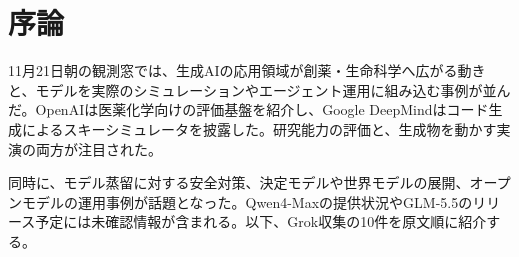 \section{序論}
11月21日朝の観測窓では、生成AIの応用領域が創薬・生命科学へ広がる動きと、モデルを実際のシミュレーションやエージェント運用に組み込む事例が並んだ。OpenAIは医薬化学向けの評価基盤を紹介し、Google DeepMindはコード生成によるスキーシミュレータを披露した。研究能力の評価と、生成物を動かす実演の両方が注目された。

同時に、モデル蒸留に対する安全対策、決定モデルや世界モデルの展開、オープンモデルの運用事例が話題となった。Qwen4-Maxの提供状況やGLM-5.5のリリース予定には未確認情報が含まれる。以下、Grok収集の10件を原文順に紹介する。
